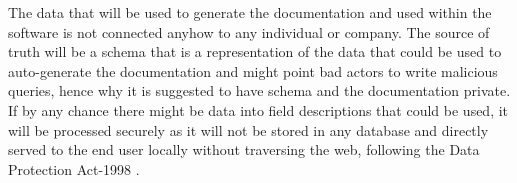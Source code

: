 The data that will be used to generate the documentation and used within the
software is not connected anyhow to any individual or company. The source of
truth will be a schema that is a representation of the data that could be used
to auto-generate the documentation and might point bad actors to write malicious
queries, hence why it is suggested to have schema and the documentation private.
If by any chance there might be data into field descriptions that could be used,
it will be processed securely as it will not be stored in any database
and directly served to the end user locally without traversing the web, following
the Data Protection Act-1998 \citep{legislation.gov.ukDataProtectionAct2022}.
